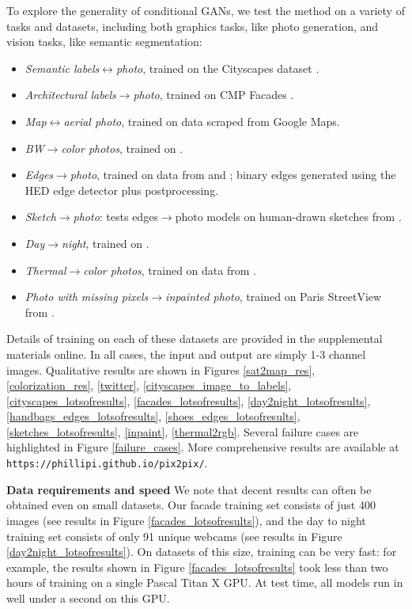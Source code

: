 \documentclass[10pt,twocolumn,letterpaper]{article}
\begin{document}
To explore the generality of conditional GANs, we test the method on a variety of tasks and datasets, including both graphics tasks, like photo generation, and vision tasks, like semantic segmentation:

\begin{itemize}
\itemsep-0.05in
\item \emph{Semantic labels$\leftrightarrow$photo}, trained on the Cityscapes dataset \cite{Cordts2016Cityscapes}.
\item \emph{Architectural labels$\rightarrow$photo}, trained on CMP Facades \cite{Tylecek13}.
\item \emph{Map$\leftrightarrow$aerial photo}, trained on data scraped from Google Maps.
\item \emph{BW$\rightarrow$color photos}, trained on \cite{russakovsky2015imagenet}.
\item \emph{Edges$\rightarrow$photo}, trained on data from \cite{zhu2016generative} and \cite{finegrained_shoes}; binary edges generated using the HED edge detector \cite{xie2015holistically} plus postprocessing.
\item \emph{Sketch$\rightarrow$photo}: tests edges$\rightarrow$photo models on human-drawn sketches from \cite{eitz2012humans}.
\item \emph{Day$\rightarrow$night}, trained on \cite{laffont2014transient}.
\item \emph{Thermal$\rightarrow$color photos}, trained on data from \cite{hwang2015multispectral}.
\item \emph{Photo with missing pixels$\rightarrow$inpainted photo}, trained on Paris StreetView from \cite{doersch2012makes}.
\end{itemize}

Details of training on each of these datasets are provided in the supplemental materials online. In all cases, the input and output are simply 1-3 channel images. Qualitative results are shown in Figures \ref{sat2map_res}, \ref{colorization_res}, \ref{twitter}, \ref{cityscapes_image_to_labels}, \ref{cityscapes_lotsofresults}, \ref{facades_lotsofresults},
\ref{day2night_lotsofresults}, \ref{handbags_edges_lotsofresults}, \ref{shoes_edges_lotsofresults}, \ref{sketches_lotsofresults}, \ref{inpaint}, \ref{thermal2rgb}. Several failure cases are highlighted in Figure \ref{failure_cases}. More comprehensive results are available at \texttt{https://phillipi.github.io/pix2pix/}.

{\bf Data requirements and speed} We note that decent results can often be obtained even on small datasets. Our facade training set consists of just 400 images (see results in Figure \ref{facades_lotsofresults}), and the day to night training set consists of only 91 unique webcams (see results in Figure \ref{day2night_lotsofresults}). On datasets of this size, training can be very fast: for example, the results shown in Figure \ref{facades_lotsofresults} took less than two hours of training on a single Pascal Titan X GPU. At test time, all models run in well under a second on this GPU.
\end{document}
